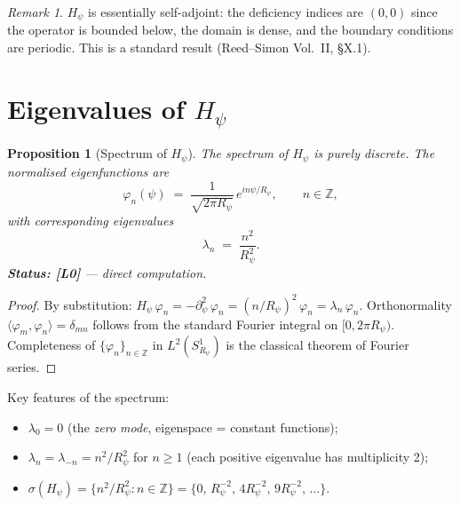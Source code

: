 \documentclass[11pt,a4paper]{article}
\newtheorem{proposition}[theorem]{Proposition}
\theoremstyle{definition}
\theoremstyle{remark}
\newtheorem{remark}[theorem]{Remark}
\newcommand{\Rp}{R_{\psi}}
\newcommand{\Hp}{H_{\psi}}
\begin{document}
\begin{remark}
$\Hp$ is essentially self-adjoint: the deficiency indices are $(0,0)$ since
the operator is bounded below, the domain is dense, and the boundary conditions
are periodic.  This is a standard result (Reed–Simon Vol.~II, §X.1).
\end{remark}

\section{Eigenvalues of $H_\psi$}
\label{sec:eigenvalues}

\begin{proposition}[Spectrum of $\Hp$]\label{prop:spectrum}
The spectrum of $\Hp$ is purely discrete.  The normalised eigenfunctions are
\begin{equation}\label{eq:eigenfunctions}
  \varphi_n(\psi) \;=\; \frac{1}{\sqrt{2\pi\Rp}}\,
    e^{i n \psi / \Rp}, \qquad n \in \mathbb{Z},
\end{equation}
with corresponding eigenvalues
\begin{equation}\label{eq:eigenvalues}
  \lambda_n \;=\; \frac{n^2}{\Rp^2}.
\end{equation}
\textbf{Status: [L0]} — direct computation.
\end{proposition}

\begin{proof}
By substitution: $\Hp\,\varphi_n = -\partial_\psi^2\,\varphi_n
= (n/\Rp)^2\,\varphi_n = \lambda_n\,\varphi_n$.
Orthonormality $\langle\varphi_m,\varphi_n\rangle = \delta_{mn}$
follows from the standard Fourier integral on $[0,2\pi\Rp)$.
Completeness of $\{\varphi_n\}_{n\in\mathbb{Z}}$ in $L^2(S^1_{\Rp})$
is the classical theorem of Fourier series.
\end{proof}

\medskip
Key features of the spectrum:
\begin{itemize}
  \item $\lambda_0 = 0$ (the \emph{zero mode}, eigenspace = constant functions);
  \item $\lambda_n = \lambda_{-n} = n^2/\Rp^2$ for $n \geq 1$
        (each positive eigenvalue has multiplicity 2);
  \item $\sigma(\Hp) = \{n^2/\Rp^2 : n \in \mathbb{Z}\}
        = \bigl\{0,\,\Rp^{-2},\,4\Rp^{-2},\,9\Rp^{-2},\,\ldots\bigr\}$.
\end{itemize}
\end{document}
